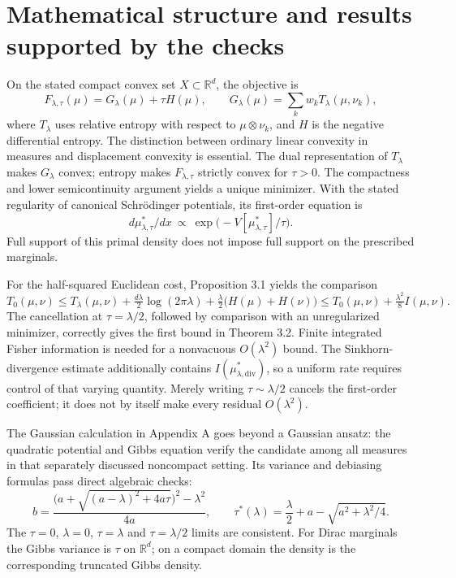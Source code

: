 \documentclass[10pt]{article}
\begin{document}
\section*{Mathematical structure and results supported by the checks}
On the stated compact convex set \(X\subset\mathbb R^d\), the objective is \[F_{\lambda,\tau}(\mu)=G_\lambda(\mu)+\tau H(\mu),\qquad
 G_\lambda(\mu)=\sum_k w_kT_\lambda(\mu,\nu_k),\] where \(T_\lambda\) uses relative entropy with respect to \(\mu\otimes\nu_k\), and \(H\) is the negative differential entropy. The distinction between ordinary linear convexity in measures and displacement convexity is essential. The dual representation of \(T_\lambda\) makes \(G_\lambda\) convex; entropy makes \(F_{\lambda,\tau}\) strictly convex for \(\tau>0\). The compactness and lower semicontinuity argument yields a unique minimizer. With the stated regularity of canonical Schrödinger potentials, its first-order equation is \[d\mu^*_{\lambda,\tau}/dx\ \propto\
       \exp\bigl(-V[\mu^*_{\lambda,\tau}]/\tau\bigr).\] Full support of this primal density does not impose full support on the prescribed marginals.\par
For the half-squared Euclidean cost, Proposition 3.1 yields the comparison \[T_0(\mu,\nu)\le
 T_\lambda(\mu,\nu)+\tfrac{d\lambda}{2}\log(2\pi\lambda)
       +\tfrac{\lambda}{2}\bigl(H(\mu)+H(\nu)\bigr)
 \le T_0(\mu,\nu)+\tfrac{\lambda^2}{8}I(\mu,\nu).\] The cancellation at \(\tau=\lambda/2\), followed by comparison with an unregularized minimizer, correctly gives the first bound in Theorem 3.2. Finite integrated Fisher information is needed for a nonvacuous \(O(\lambda^2)\) bound. The Sinkhorn-divergence estimate additionally contains \(I(\mu^*_{\lambda,\mathrm{div}})\), so a uniform rate requires control of that varying quantity. Merely writing \(\tau\sim\lambda/2\) cancels the first-order coefficient; it does not by itself make every residual \(O(\lambda^2)\).\par
The Gaussian calculation in Appendix A goes beyond a Gaussian ansatz: the quadratic potential and Gibbs equation verify the candidate among all measures in that separately discussed noncompact setting. Its variance and debiasing formulas pass direct algebraic checks: \[b=\frac{\bigl(a+\sqrt{(a-\lambda)^2+4a\tau}\bigr)^2-\lambda^2}{4a},
 \qquad
 \tau^*(\lambda)=\frac{\lambda}{2}+a-\sqrt{a^2+\lambda^2/4}.\] The \(\tau=0\), \(\lambda=0\), \(\tau=\lambda\) and \(\tau=\lambda/2\) limits are consistent. For Dirac marginals the Gibbs variance is \(\tau\) on \(\mathbb R^d\); on a compact domain the density is the corresponding truncated Gibbs density.\par
\end{document}
